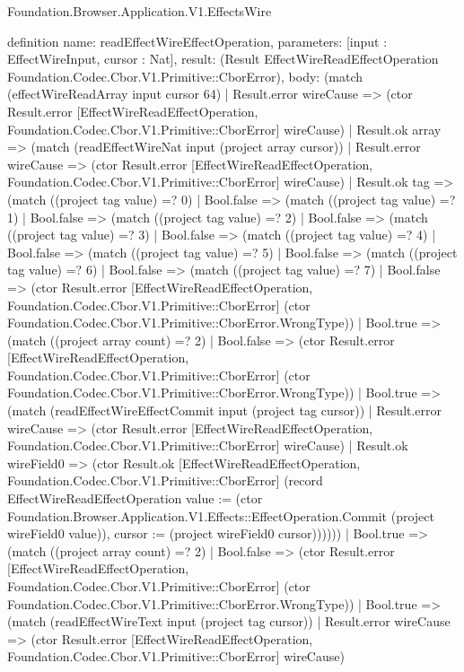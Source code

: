 \begin{lexlean}{Foundation.Browser.Application.V1.EffectsWire}
\begin{semanticmodule}
definition{
  name: readEffectWireEffectOperation,
  parameters: [input : EffectWireInput, cursor : Nat],
  result: (Result EffectWireReadEffectOperation Foundation.Codec.Cbor.V1.Primitive::CborError),
  body: (match (effectWireReadArray input cursor 64)
    | Result.error wireCause => (ctor Result.error [EffectWireReadEffectOperation, Foundation.Codec.Cbor.V1.Primitive::CborError] wireCause)
    | Result.ok array => (match (readEffectWireNat input (project array cursor))
      | Result.error wireCause => (ctor Result.error [EffectWireReadEffectOperation, Foundation.Codec.Cbor.V1.Primitive::CborError] wireCause)
      | Result.ok tag => (match ((project tag value) =? 0)
        | Bool.false => (match ((project tag value) =? 1)
          | Bool.false => (match ((project tag value) =? 2)
            | Bool.false => (match ((project tag value) =? 3)
              | Bool.false => (match ((project tag value) =? 4)
                | Bool.false => (match ((project tag value) =? 5)
                  | Bool.false => (match ((project tag value) =? 6)
                    | Bool.false => (match ((project tag value) =? 7)
                      | Bool.false => (ctor Result.error [EffectWireReadEffectOperation, Foundation.Codec.Cbor.V1.Primitive::CborError] (ctor Foundation.Codec.Cbor.V1.Primitive::CborError.WrongType))
                      | Bool.true => (match ((project array count) =? 2)
                        | Bool.false => (ctor Result.error [EffectWireReadEffectOperation, Foundation.Codec.Cbor.V1.Primitive::CborError] (ctor Foundation.Codec.Cbor.V1.Primitive::CborError.WrongType))
                        | Bool.true => (match (readEffectWireEffectCommit input (project tag cursor))
                          | Result.error wireCause => (ctor Result.error [EffectWireReadEffectOperation, Foundation.Codec.Cbor.V1.Primitive::CborError] wireCause)
                          | Result.ok wireField0 => (ctor Result.ok [EffectWireReadEffectOperation, Foundation.Codec.Cbor.V1.Primitive::CborError] (record EffectWireReadEffectOperation {value := (ctor Foundation.Browser.Application.V1.Effects::EffectOperation.Commit (project wireField0 value)), cursor := (project wireField0 cursor)})))))
                    | Bool.true => (match ((project array count) =? 2)
                      | Bool.false => (ctor Result.error [EffectWireReadEffectOperation, Foundation.Codec.Cbor.V1.Primitive::CborError] (ctor Foundation.Codec.Cbor.V1.Primitive::CborError.WrongType))
                      | Bool.true => (match (readEffectWireText input (project tag cursor))
                        | Result.error wireCause => (ctor Result.error [EffectWireReadEffectOperation, Foundation.Codec.Cbor.V1.Primitive::CborError] wireCause)
}
\end{semanticmodule}
\end{lexlean}
